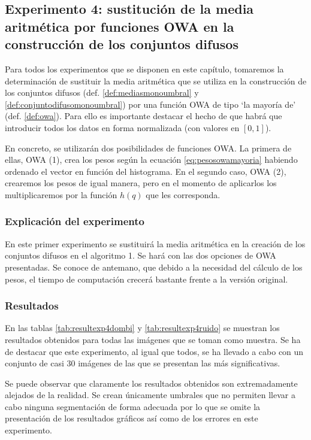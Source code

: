 
\subsection{Experimento 4: sustitución de la media aritmética por funciones OWA en la construcción de los conjuntos difusos}
Para todos los experimentos que se disponen en este capítulo, tomaremos la determinación de sustituir la media aritmética que se utiliza en la construcción de los conjuntos difusos (def. \ref{def:mediasmonoumbral} y \ref{def:conjuntodifusomonoumbral}) por una función OWA de tipo `la mayoría de' (def. \ref{def:owa}). Para ello es importante destacar el hecho de que habrá que introducir todos los datos en forma normalizada (con valores en $[0,1]$).

En concreto, se utilizarán dos posibilidades de funciones OWA. La primera de ellas, OWA (1), crea los pesos según la ecuación \ref{eq:pesosowamayoria} habiendo ordenado el vector en función del histograma. En el segundo caso, OWA (2), crearemos los pesos de igual manera, pero en el momento de aplicarlos los multiplicaremos por la función $h(q)$ que les corresponda.

\subsubsection{Explicación del experimento}
En este primer experimento se sustituirá la media aritmética en la creación de los conjuntos difusos en el algoritmo 1. Se hará con las dos opciones de OWA presentadas. Se conoce de antemano, que debido a la necesidad del cálculo de los pesos, el tiempo de computación crecerá bastante frente a la versión original.


\subsubsection{Resultados}

En las tablas \ref{tab:resultexp4dombi} y \ref{tab:resultexp4ruido} se muestran los resultados obtenidos para todas las imágenes que se toman como muestra. Se ha de destacar que este experimento, al igual que todos, se ha llevado a cabo con un conjunto de casi 30 imágenes de las que se presentan las más significativas. 

Se puede observar que claramente los resultados obtenidos son extremadamente alejados de la realidad. Se crean únicamente umbrales que no permiten llevar a cabo ninguna segmentación de forma adecuada por lo que se omite la presentación de los resultados gráficos así como de los errores en este experimento.


